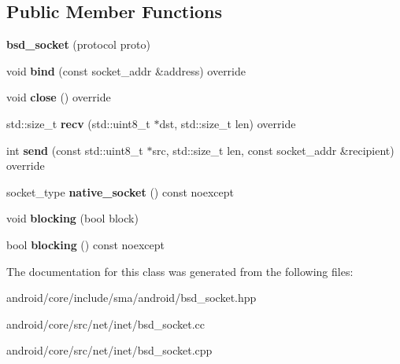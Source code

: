 \subsection*{Public Member Functions}
\begin{DoxyCompactItemize}
\item 
\hypertarget{classsma_1_1bsd__socket_a23f9938b524e14b5f14b8d2a9ba09038}{{\bfseries bsd\-\_\-socket} (protocol proto)}\label{classsma_1_1bsd__socket_a23f9938b524e14b5f14b8d2a9ba09038}

\item 
\hypertarget{classsma_1_1bsd__socket_afd5770cd9a7a4245575516ce8bb18a98}{void {\bfseries bind} (const socket\-\_\-addr \&address) override}\label{classsma_1_1bsd__socket_afd5770cd9a7a4245575516ce8bb18a98}

\item 
\hypertarget{classsma_1_1bsd__socket_a5113af941c9ba60391653542bc9bb69f}{void {\bfseries close} () override}\label{classsma_1_1bsd__socket_a5113af941c9ba60391653542bc9bb69f}

\item 
\hypertarget{classsma_1_1bsd__socket_abfd12d2ac34cd0aed4c5e33b76d3f651}{std\-::size\-\_\-t {\bfseries recv} (std\-::uint8\-\_\-t $\ast$dst, std\-::size\-\_\-t len) override}\label{classsma_1_1bsd__socket_abfd12d2ac34cd0aed4c5e33b76d3f651}

\item 
\hypertarget{classsma_1_1bsd__socket_a41c609b6761cc57f539e4449e5e601c6}{int {\bfseries send} (const std\-::uint8\-\_\-t $\ast$src, std\-::size\-\_\-t len, const socket\-\_\-addr \&recipient) override}\label{classsma_1_1bsd__socket_a41c609b6761cc57f539e4449e5e601c6}

\item 
\hypertarget{classsma_1_1bsd__socket_a0bdaeca951937be487bda6adaa5afc6a}{socket\-\_\-type {\bfseries native\-\_\-socket} () const noexcept}\label{classsma_1_1bsd__socket_a0bdaeca951937be487bda6adaa5afc6a}

\item 
\hypertarget{classsma_1_1bsd__socket_aa1848cfaed96e5a30e759990a7217b5d}{void {\bfseries blocking} (bool block)}\label{classsma_1_1bsd__socket_aa1848cfaed96e5a30e759990a7217b5d}

\item 
\hypertarget{classsma_1_1bsd__socket_ad21c78f0957ca922d67b0346aafddde4}{bool {\bfseries blocking} () const noexcept}\label{classsma_1_1bsd__socket_ad21c78f0957ca922d67b0346aafddde4}

\end{DoxyCompactItemize}


The documentation for this class was generated from the following files\-:\begin{DoxyCompactItemize}
\item 
android/core/include/sma/android/bsd\-\_\-socket.\-hpp\item 
android/core/src/net/inet/bsd\-\_\-socket.\-cc\item 
android/core/src/net/inet/bsd\-\_\-socket.\-cpp\end{DoxyCompactItemize}

